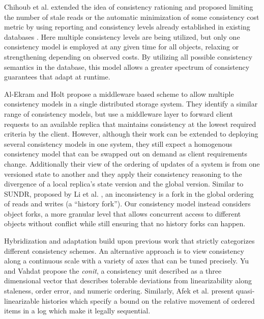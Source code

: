 \documentclass[10pt,conference,compsocconf,letterpaper]{IEEEtran}
\begin{document}
Chihoub et al. extended the idea of consistency rationing and proposed limiting the number of stale reads or the automatic minimization of some consistency cost metric by using reporting and consistency levels already established in existing databases \cite{chihoub_harmony:_2012,chihoub_consistency_2013}. Here multiple consistency levels are being utilized, but only one consistency model is employed at any given time for all objects, relaxing or strengthening depending on observed costs. By utilizing all possible consistency semantics in the database, this model allows a greater spectrum of consistency guarantees that adapt at runtime.

Al-Ekram and Holt \cite{al-ekram_multi-consistency_2010} propose a middleware based scheme to allow multiple consistency models in a single distributed storage system. They identify a similar range of consistency models, but use a middleware layer to forward client requests to an available replica that maintains consistency at the lowest required criteria by the client. However, although their work can be extended to deploying several consistency models in one system, they still expect a homogenous consistency model that can be swapped out on demand as client requirements change. Additionally their view of the ordering of updates of a system is from one versioned state to another and they apply their consistency reasoning to the divergence of a local replica's state version and the global version. Similar to SUNDR, proposed by Li et al. \cite{li_secure_2004}, an inconsistency is a fork in the global ordering of reads and writes (a ``history fork''). Our consistency model instead considers object forks, a more granular level that allows concurrent access to different objects without conflict while still ensuring that no history forks can happen.

Hybridization and adaptation build upon previous work that strictly categorizes different consistency schemes. An alternative approach is to view consistency along a continuous scale with a variety of axes that can be tuned precisely. Yu and Vahdat \cite{yu_design_2002} propose the \textit{conit}, a consistency unit described as a three dimensional vector that describes tolerable deviations from linearizability along staleness, order error, and numeric ordering. Similarly, Afek et al. \cite{afek_quasi-linearizability:_2010} present quasi-linearizable histories which specify a bound on the relative movement of ordered items in a log which make it legally sequential.
\end{document}
